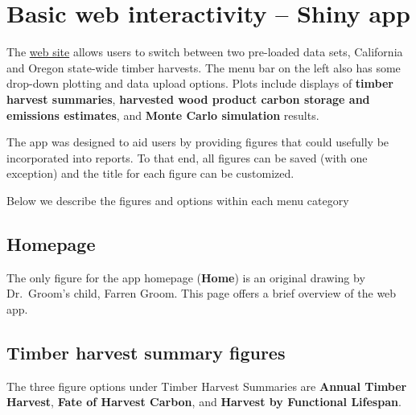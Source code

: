 \documentclass[
  openany]{book}
\begin{document}
\hypertarget{app-shiny}{%
\section{Basic web interactivity -- Shiny app}\label{app-shiny}}

The \href{https://groomanalyticsllc.shinyapps.io/HWP-C-vR/}{web site} allows users to switch between two pre-loaded data sets, California and Oregon state-wide timber harvests. The menu bar on the left also has some drop-down plotting and data upload options. Plots include displays of \textbf{timber harvest summaries}, \textbf{harvested wood product carbon storage and emissions estimates}, and \textbf{Monte Carlo simulation} results.

The app was designed to aid users by providing figures that could usefully be incorporated into reports. To that end, all figures can be saved (with one exception) and the title for each figure can be customized.

Below we describe the figures and options within each menu category

\hypertarget{app-shiny-home}{%
\subsection{Homepage}\label{app-shiny-home}}

The only figure for the app homepage (\textbf{Home}) is an original drawing by Dr.~Groom's child, Farren Groom. This page offers a brief overview of the web app.

\hypertarget{app-shiny-timber}{%
\subsection{Timber harvest summary figures}\label{app-shiny-timber}}

The three figure options under Timber Harvest Summaries are \textbf{Annual Timber Harvest}, \textbf{Fate of Harvest Carbon}, and \textbf{Harvest by Functional Lifespan}.
\end{document}
